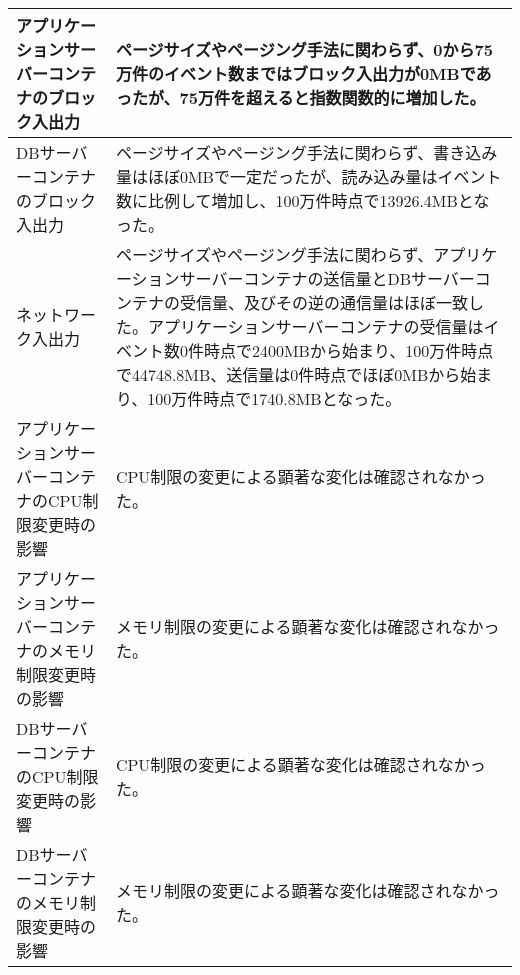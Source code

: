 \documentclass[../../../main]{subfiles}
\begin{document}
\begin{table}[H]
\begin{tabular}{|p{4cm}|p{10cm}|}
            アプリケーションサーバーコンテナのブロック入出力     & ページサイズやページング手法に関わらず、0から75万件のイベント数まではブロック入出力が0MBであったが、75万件を超えると指数関数的に増加した。                                                                                                                                                                       \\ \hline
            DBサーバーコンテナのブロック入出力           & ページサイズやページング手法に関わらず、書き込み量はほぼ0MBで一定だったが、読み込み量はイベント数に比例して増加し、100万件時点で13926.4MBとなった。                                                                                                                                                               \\ \hline
            ネットワーク入出力                    & ページサイズやページング手法に関わらず、アプリケーションサーバーコンテナの送信量とDBサーバーコンテナの受信量、及びその逆の通信量はほぼ一致した。アプリケーションサーバーコンテナの受信量はイベント数0件時点で2400MBから始まり、100万件時点で44748.8MB、送信量は0件時点でほぼ0MBから始まり、100万件時点で1740.8MBとなった。                                                                 \\ \hline
            アプリケーションサーバーコンテナのCPU制限変更時の影響 & CPU制限の変更による顕著な変化は確認されなかった。                                                                                                                                                                                                                      \\ \hline
            アプリケーションサーバーコンテナのメモリ制限変更時の影響 & メモリ制限の変更による顕著な変化は確認されなかった。                                                                                                                                                                                                                      \\ \hline
            DBサーバーコンテナのCPU制限変更時の影響       & CPU制限の変更による顕著な変化は確認されなかった。                                                                                                                                                                                                                      \\ \hline
            DBサーバーコンテナのメモリ制限変更時の影響       & メモリ制限の変更による顕著な変化は確認されなかった。                                                                                                                                                                                                                      \\ \hline
        \end{tabular}
    \end{table}
\end{document}
